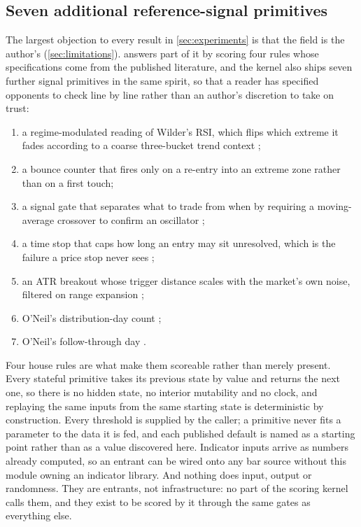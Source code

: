 \subsection{Seven additional reference-signal primitives}\label{sec:entrants}

The largest objection to every result in \cref{sec:experiments} is that the field is the author's (\cref{sec:limitations}).  answers part of it by scoring four rules whose specifications come from the published literature, and the kernel also ships seven further signal primitives in the same spirit, so that a reader has specified opponents to check line by line rather than an author's discretion to take on trust:
\begin{enumerate}[leftmargin=*,itemsep=1pt]
\item a regime-modulated reading of Wilder's RSI, which flips which extreme it fades according to a coarse three-bucket trend context \citep{wilder1978new};
\item a bounce counter that fires only on a re-entry into an extreme zone rather than on a first touch;
\item a signal gate that separates what to trade from when by requiring a moving-average crossover to confirm an oscillator \citep{brock1992simple};
\item a time stop that caps how long an entry may sit unresolved, which is the failure a price stop never sees \citep{kaufman2013systems};
\item an ATR breakout whose trigger distance scales with the market's own noise, filtered on range expansion \citep{wilder1978new};
\item O'Neil's distribution-day count \citep{oneil2009howto};
\item O'Neil's follow-through day \citep{oneil2009howto}.
\end{enumerate}

Four house rules are what make them scoreable rather than merely present. Every stateful primitive takes its previous state by value and returns the next one, so there is no hidden state, no interior mutability and no clock, and replaying the same inputs from the same starting state is deterministic by construction. Every threshold is supplied by the caller; a primitive never fits a parameter to the data it is fed, and each published default is named as a starting point rather than as a value discovered here. Indicator inputs arrive as numbers already computed, so an entrant can be wired onto any bar source without this module owning an indicator library. And nothing does input, output or randomness. They are entrants, not infrastructure: no part of the scoring kernel calls them, and they exist to be scored by it through the same gates as everything else.


